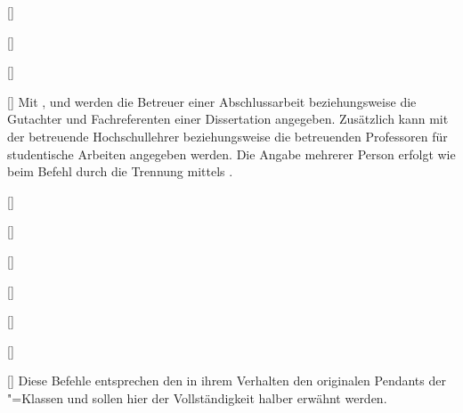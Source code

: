 \begin{Declaration*}{}
\begin{Declaration*}{}
\begin{Declaration*}{}
\begin{Declaration}{[]}
\begin{Declaration}{[]}
\begin{Declaration}{[]}
\begin{Declaration}{[]}
\printdeclarationlist%
%
%
%
%
Mit ,  und  werden die Betreuer 
einer Abschlussarbeit beziehungsweise die Gutachter und Fachreferenten einer 
Dissertation angegeben. Zusätzlich kann mit  der betreuende 
Hochschullehrer beziehungsweise die betreuenden Professoren für studentische 
Arbeiten angegeben werden. Die Angabe mehrerer Person erfolgt wie beim Befehl 
 durch die Trennung mittels .
%
\end{Declaration}
\end{Declaration}
\end{Declaration}
\end{Declaration}

\begin{Declaration}{[]}
\begin{Declaration}{[]}
\begin{Declaration}{[]}
\begin{Declaration}{[]}
\begin{Declaration}{[]}
\begin{Declaration}{[]}
\begin{Declaration}{[]}
\printdeclarationlist%
%
Diese Befehle entsprechen den in ihrem Verhalten den originalen Pendants der 
\KOMAScript"=Klassen und sollen hier der Vollständigkeit halber erwähnt werden.


\end{Declaration}
\end{Declaration}
\end{Declaration}
\end{Declaration}
\end{Declaration}
\end{Declaration}
\end{Declaration}
\end{Declaration*}
\end{Declaration*}
\end{Declaration*}
